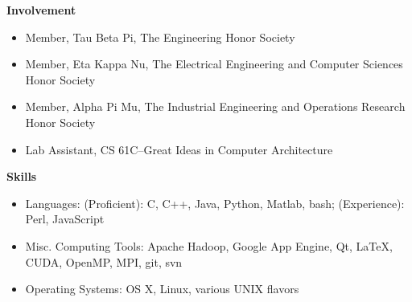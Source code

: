 \documentclass[letterpaper,11pt]{article}
\newcommand{\desitem}[1]{\item #1 \vspace{-7pt}}
\newcommand{\resheading}[1]{{\large \colorbox{mygrey}{\begin{minipage}{\textwidth}{\textbf{#1 \vphantom{p\^{E}}}}\end{minipage}}}}
\begin{document}
\resheading{Involvement}
\begin{itemize}
    \desitem{Member,
    Tau Beta Pi, The Engineering Honor Society}
     \desitem{Member,
    Eta Kappa Nu, The Electrical Engineering and Computer Sciences Honor Society}
    \desitem{Member,
    Alpha Pi Mu, The Industrial Engineering and Operations Research Honor Society}
   \desitem{Lab Assistant,
    CS 61C--Great Ideas in Computer Architecture}
\end{itemize}

\vspace{0.1in}

\resheading{Skills}
\begin{itemize}
    \desitem{Languages:
                    (Proficient): C, C++, Java, Python, Matlab, bash; (Experience): Perl, JavaScript}
    \desitem{Misc. Computing Tools:
                     Apache Hadoop, Google App Engine, Qt, LaTeX, CUDA, OpenMP, MPI, git, svn}
    \desitem{Operating Systems:
                     OS X, Linux, various UNIX flavors}
\end{itemize}
\end{document}
